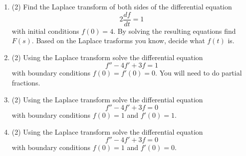 \documentclass[12pt]{article}
\begin{document}
\begin{enumerate}


\item (2)
Find the Laplace transform of both sides of the differential equation
\[
 2 \frac{df}{dt} = 1
\]
with initial conditions $f(0) =4$. By solving the resulting equations
find $F(s)$. Based on the Laplace trasforms you know, decide what $f(t)$ is.


\item (2)
Using the Laplace transform solve the differential equation
\begin{equation}
f''-4f'+3f=1
\end{equation}
with boundary conditions $f(0)=f'(0)=0$. You will need to do partial fractions.

\item (2)
Using the Laplace transform solve the differential equation
\begin{equation}
f''-4f'+3f=0
\end{equation}
with boundary conditions $f(0)=1$ and $f'(0)=1$.

\item (2)
Using the Laplace transform solve the differential equation
\begin{equation}
f''-4f'+3f=0
\end{equation}
with boundary conditions $f(0)=1$ and $f'(0)=0$.

\end{enumerate}

\vfill

\noindent
\end{document}
